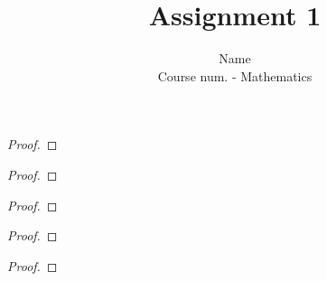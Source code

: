 \documentclass[10pt]{article}
\newenvironment{Oppgave}[2][Oppgave]{\begin{trivlist}
\item[\hskip \labelsep {\bfseries #1}\hskip \labelsep {\bfseries #2.}]}{\end{trivlist}}
\begin{document}
\title{Assignment 1}
\author{Name\\
Course num. - Mathematics}
\maketitle
\begin{Oppgave}{1}

\end{Oppgave}
\begin{proof}

\end{proof}



\begin{Oppgave}{2}

\end{Oppgave}
\begin{proof}

\end{proof}



\begin{Oppgave}{3}

\end{Oppgave}
\begin{proof}

\end{proof}



\begin{Oppgave}{4}

\end{Oppgave}
\begin{proof}

\end{proof}



\begin{Oppgave}{5}

\end{Oppgave}
\begin{proof}

\end{proof}
\end{document}
